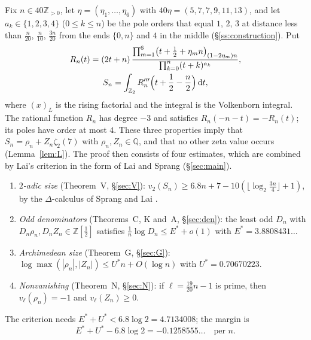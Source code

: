 \documentclass{amsart}
\theoremstyle{definition}
\theoremstyle{remark}
\numberwithin{equation}{section}
\newcommand{\Z}{\mathbb{Z}}
\newcommand{\Q}{\mathbb{Q}}
\newcommand{\dd}{\,\mathrm{d}}
\begin{document}
Fix $n\in40\Z_{>0}$, let $\eta=(\eta_1,\dots,\eta_6)$ with
$40\eta=(5,7,7,9,11,13)$, and let
$a_k\in\{1,2,3,4\}$ ($0\le k\le n$) be the pole orders that equal $1$,
$2$, $3$ at distance less than $\frac n{20}$, $\frac n{10}$, $\frac{3n}{20}$
from the ends $\{0,n\}$ and $4$ in the middle (\S\ref{ss:construction}). Put
\begin{equation}\label{eq:intro-R}
  \begin{gathered}
  R_n(t)=(2t+n)\,\frac{\prod_{m=1}^{6}\bigl(t+\frac12+\eta_mn\bigr)_{(1-2\eta_m)n}}
  {\prod_{k=0}^{n}(t+k)^{a_k}},\\
  S_n=\int_{\Z_2}R_n'''\Bigl(t+\frac12-\frac n2\Bigr)\dd t,
  \end{gathered}
\end{equation}
where $(x)_L$ is the rising factorial and the integral is the Volkenborn
integral. The rational function $R_n$ has degree $-3$ and satisfies
$R_n(-n-t)=-R_n(t)$; its poles have order at most $4$. These three properties
imply that $S_n=\rho_n+Z_n\zeta_2(7)$ with $\rho_n,Z_n\in\Q$, and that no
other zeta value occurs (Lemma~\ref{lem:L}). The proof then consists of four
estimates, which are combined by Lai's criterion in the form of Lai and
Sprang (\S\ref{sec:main}).
\begin{enumerate}
\item[(V)] \emph{$2$-adic size} (Theorem~V, \S\ref{sec:V}):
  $v_2(S_n)\ge6.8n+7-10(\lfloor\log_2\frac{3n}4\rfloor+1)$, by the
  $\Delta$-calculus of Sprang and Lai \cite{Spr20,Lai25}.
\item[(A)] \emph{Odd denominators} (Theorems~C, K and~A, \S\ref{sec:den}):
  the least odd $D_n$ with $D_n\rho_n,D_nZ_n\in\Z[\frac12]$ satisfies
  $\frac1n\log D_n\le E^*+o(1)$ with $E^*=3.8808431\ldots$
\item[(G)] \emph{Archimedean size} (Theorem~G, \S\ref{sec:G}):
  $\log\max(|\rho_n|,|Z_n|)\le U^*n+O(\log n)$ with $U^*=0.70670223$.
\item[(N)] \emph{Nonvanishing} (Theorem~N, \S\ref{sec:N}): if
  $\ell=\frac{19}{20}n-1$ is prime, then $v_\ell(\rho_n)=-1$ and
  $v_\ell(Z_n)\ge0$.
\end{enumerate}
The criterion needs $E^*+U^*<6.8\log2=4.7134008$; the margin is
\[
  E^*+U^*-6.8\log2=-0.1258555\ldots\quad\text{per }n.
\]
\end{document}
